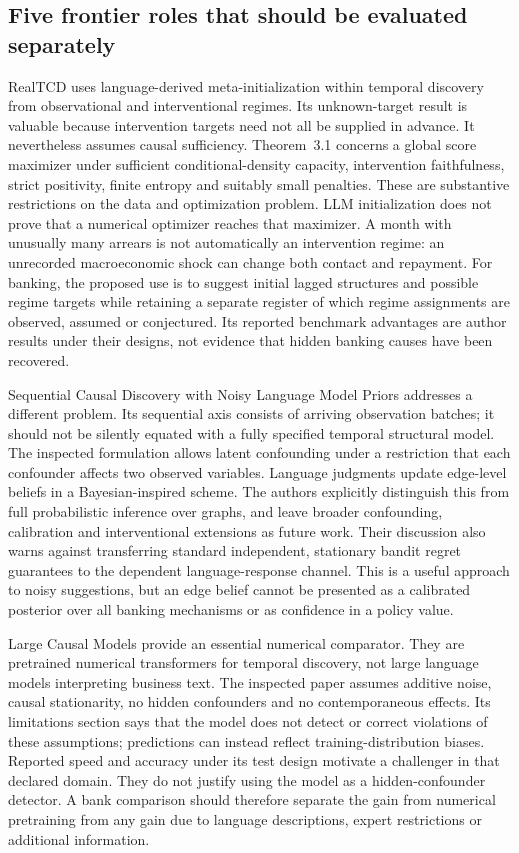 \subsection{Five frontier roles that should be evaluated separately}

RealTCD uses language-derived meta-initialization within temporal discovery
from observational and interventional regimes. Its unknown-target result is
valuable because intervention targets need not all be supplied in advance.
It nevertheless assumes causal sufficiency. Theorem~3.1 concerns a global
score maximizer under sufficient conditional-density capacity, intervention
faithfulness, strict positivity, finite entropy and suitably small penalties.
These are substantive restrictions on the data and optimization problem.
LLM initialization does not prove that a numerical optimizer reaches that
maximizer. A month with unusually many arrears is not automatically an
intervention regime: an unrecorded macroeconomic shock can change both
contact and repayment. For banking, the proposed use is to suggest initial
lagged structures and possible regime targets while retaining a separate
register of which regime assignments are observed, assumed or conjectured.
Its reported benchmark advantages are author results under their designs,
not evidence that hidden banking causes have been recovered.
\citep{v12_la_2404_14786}

Sequential Causal Discovery with Noisy Language Model Priors addresses a
different problem. Its sequential axis consists of arriving observation
batches; it should not be silently equated with a fully specified temporal
structural model. The inspected formulation allows latent confounding under
a restriction that each confounder affects two observed variables. Language
judgments update edge-level beliefs in a Bayesian-inspired scheme. The
authors explicitly distinguish this from full probabilistic inference over
graphs, and leave broader confounding, calibration and interventional
extensions as future work. Their discussion also warns against transferring
standard independent, stationary bandit regret guarantees to the dependent
language-response channel. This is a useful approach to noisy suggestions,
but an edge belief cannot be presented as a calibrated posterior over all
banking mechanisms or as confidence in a policy value.
\citep{v12_la_2506_16234}

Large Causal Models provide an essential numerical comparator. They are
pretrained numerical transformers for temporal discovery, not large language
models interpreting business text. The inspected paper assumes additive
noise, causal stationarity, no hidden confounders and no contemporaneous
effects. Its limitations section says that the model does not detect or
correct violations of these assumptions; predictions can instead reflect
training-distribution biases. Reported speed and accuracy under its test
design motivate a challenger in that declared domain. They do not justify
using the model as a hidden-confounder detector. A bank comparison should
therefore separate the gain from numerical pretraining from any gain due to
language descriptions, expert restrictions or additional information.
\citep{v12_la_2602_18662}

